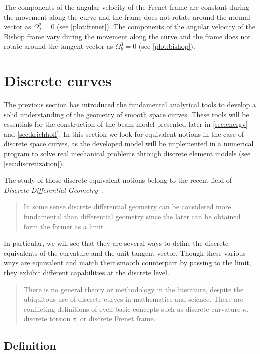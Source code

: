 The components of the angular velocity of the Frenet frame are constant during the movement along the curve and the frame does not rotate around the normal vector as $\Omega_f^2 = 0$ (see \cref{plot:frenet}). The components of the angular velocity of the Bishop frame vary during the movement along the curve and the frame does not rotate around the tangent vector as $\Omega_b^3 = 0$ (see \cref{plot:bishop}).

\section{Discrete curves}\label{sec:discrete_curves}

The previous section has introduced the fundamental analytical tools to develop a solid understanding of the geometry of smooth space curves. These tools will be essentials for the construction of the beam model presented later in \cref{sec:energy} and \cref{sec:krichhoff}. In this section we look for equivalent notions in the case of discrete space curves, as the developed model will be implemented in a numerical program to solve real mechanical problems through discrete element models (see \cref{sec:discretization}).

The study of those discrete equivalent notions belong to the recent field of \emph{Discrete Differential Geometry}~: \blockcquote[p.7]{Hoffmann2008}{In some sense discrete differential geometry can be considered more fundamental than differential geometry since the later can be obtained form the former as a limit}. In particular, we will see that they are several ways to define the discrete equivalents of the curvature and the unit tangent vector. Though these various ways are equivalent and match their smooth counterpart by passing to the limit, they exhibit different capabilities at the discrete level.

 \blockcquote[p.1]{Carroll2014}{There is no general theory or methodology in the literature, despite the ubiquitous use of discrete curves in mathematics and science. There are conflicting definitions of even basic concepts such as discrete curvature $\kappa$, discrete torsion $\tau$, or discrete Frenet frame.}.


\subsection{Definition}

